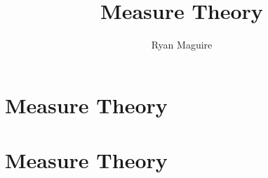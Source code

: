 \documentclass[crop=false,class=book,oneside]{standalone}
\begin{document}
    \ifx\ifmathcourses\undefined
        \title{Measure Theory}
        \author{Ryan Maguire}
        \date{\vspace{-5ex}}
        \maketitle
        \tableofcontents
        \clearpage
        \setcounter{chapter}{11}
        \chapter{Measure Theory}
    \else
        \chapter{Measure Theory}
    \fi
\end{document}
